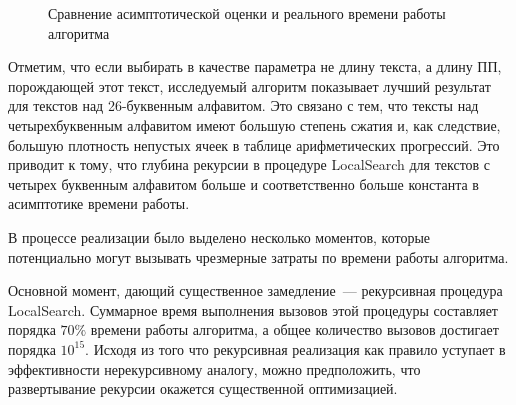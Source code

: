 \documentclass[14pt]{article}
\begin{document}
\begin{figure}[H]
\begin{center}
    \end{center}
    \caption{Сравнение асимптотической оценки и реального времени работы алгоритма}
    \label{real_vs_theor}
\end{figure}

Отметим, что если выбирать в качестве параметра не длину текста, а длину ПП, порождающей этот текст, исследуемый алгоритм показывает лучший результат для текстов над 26-буквенным алфавитом. Это связано с тем, что тексты над четырехбуквенным алфавитом имеют большую степень сжатия и, как следствие, большую плотность непустых ячеек в таблице арифметических прогрессий. Это приводит к тому, что глубина рекурсии в процедуре LocalSearch для текстов с четырех буквенным алфавитом больше и соответственно больше константа в асимптотике времени работы.

В процессе реализации было выделено несколько моментов, которые потенциально могут вызывать чрезмерные затраты по времени
работы алгоритма.

Основной момент, дающий существенное замедление~--- рекурсивная процедура LocalSearch. Суммарное время выполнения вызовов этой процедуры составляет порядка $70\%$ времени работы алгоритма, а общее количество вызовов достигает порядка $10^{15}$. Исходя из того что рекурсивная реализация как правило уступает в эффективности нерекурсивному аналогу, можно предположить, что развертывание рекурсии окажется существенной оптимизацией.
\end{document}
